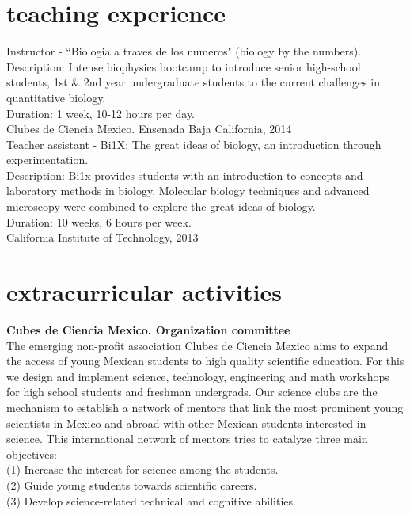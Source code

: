 \documentclass[]{friggeri-cv}
\begin{document}
\section{teaching experience}
Instructor - ``Biologia a traves de los numeros" (biology by the numbers).\\
Description: Intense biophysics bootcamp to introduce senior high-school students, 1st \& 2nd year undergraduate students to the current challenges in quantitative biology.\\
Duration: 1 week, 10-12 hours per day.\\
{Clubes de Ciencia Mexico. Ensenada Baja California, 2014}\\

Teacher assistant - Bi1X: The great ideas of biology, an introduction through experimentation.\\
Description: Bi1x provides students with an introduction to concepts and laboratory methods in biology. Molecular biology techniques and advanced microscopy were combined to explore the great ideas of biology.\\
Duration: 10 weeks, 6 hours per week.\\
{California Institute of Technology, 2013}\\

\section{extracurricular activities}
\textbf{Cubes de Ciencia Mexico. Organization committee}\\
The emerging non-profit association Clubes de Ciencia Mexico aims to expand the access of young Mexican students to high quality scientific education. For this we design and implement science, technology, engineering and math workshops for high school students and freshman undergrads. Our science clubs are the mechanism to establish a network of mentors that link the most prominent young scientists in Mexico and abroad with other Mexican students interested in science. This international network of mentors tries to catalyze three main objectives:\\
(1) Increase the interest for science among the students.\\
(2) Guide young students towards scientific careers.\\
(3) Develop science-related technical and cognitive abilities.
\end{document}
